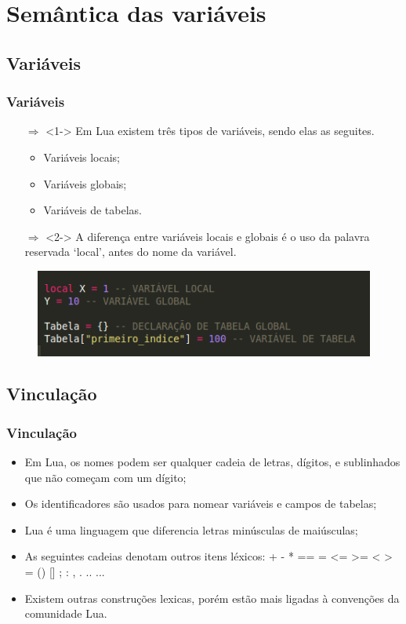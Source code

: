 \documentclass{beamer}
\begin{document}
\section{Semântica das variáveis}
\subsection{Variáveis}
\begin{frame}[fragile]
\frametitle{Variáveis}
	\begin{itemize}
	\item [$\Rightarrow$]<1-> Em Lua existem três tipos de variáveis, sendo elas as seguites.
	\begin{itemize}
		\item Variáveis locais;
		\item Variáveis globais;
		\item Variáveis de tabelas.
	\end{itemize}
	\item [$\Rightarrow$]<2-> A diferença entre variáveis locais e globais é o uso da palavra reservada ‘local’, antes do nome da variável.
	\end{itemize}
	\begin{figure}[!htb]
		\centering
		\includegraphics[width=0.7\linewidth]{imagens/variaveis}
	\end{figure}
\end{frame}

\subsection{Vinculação}
\begin{frame}[fragile]
\frametitle{Vinculação}
	\begin{itemize}
	\item Em Lua, os nomes podem ser qualquer cadeia de letras, dígitos, e sublinhados que não começam com um dígito; 
	\item Os identificadores são usados para nomear variáveis e campos de tabelas;
	\item Lua é uma linguagem que diferencia letras minúsculas de maiúsculas;
	\item As seguintes cadeias denotam outros itens léxicos: + - * == = <= >= < > = () [] ; : , . .. ...
	\item Existem outras construções lexicas, porém estão mais ligadas à convenções da comunidade Lua.
	\end{itemize}
\end{frame}
\end{document}
